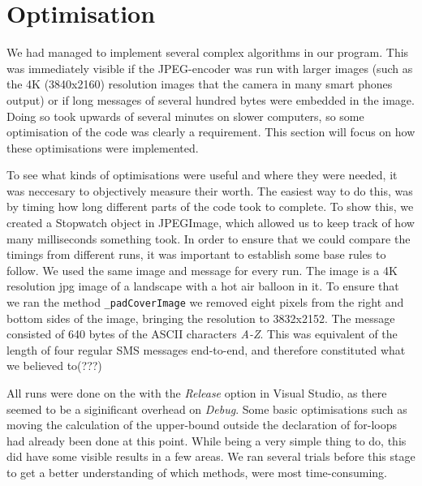 \section{Optimisation}
We had managed to implement several complex algorithms in our program.
This was immediately visible if the JPEG-encoder was run with larger images (such as the 4K (3840x2160) resolution images that the camera in many smart phones output) or if long messages of several hundred bytes were embedded in the image.
Doing so took upwards of several minutes on slower computers, so some optimisation of the code was clearly a requirement.
This section will focus on how these optimisations were implemented.
\vspace*{12pt}

To see what kinds of optimisations were useful and where they were needed, it was neccesary to objectively measure their worth.
The easiest way to do this, was by timing how long different parts of the code took to complete.
To show this, we created a Stopwatch object in JPEGImage, which allowed us to keep track of how many milliseconds something took.
In order to ensure that we could compare the timings from different runs, it was important to establish some base rules to follow.
We used the same image and message for every run.
The image is a 4K resolution jpg image of a landscape with a hot air balloon in it.
To ensure that we ran the method \lstinline|_padCoverImage| we removed eight pixels from the right and bottom sides of the image, bringing the resolution to 3832x2152.
The message consisted of 640 bytes of the ASCII characters \textit{A-Z}.
This was equivalent of the length of four regular SMS messages end-to-end, and therefore constituted what we believed to(???)

All runs were done on the with the \textit{Release} option in Visual Studio, as there seemed to be a siginificant overhead on \textit{Debug}.
Some basic optimisations such as moving the calculation of the upper-bound outside the declaration of for-loops had already been done at this point.
While being a very simple thing to do, this did have some visible results in a few areas.
We ran several trials before this stage to get a better understanding of which methods, were most time-consuming.

